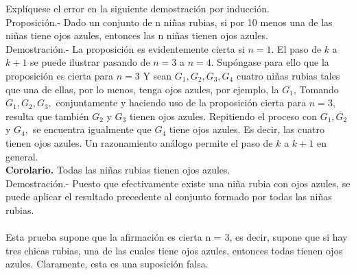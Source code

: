 \begin{teo}
Explíquese el error en la siguiente demostración por inducción.\\
Proposición.- Dado un conjunto de n niñas rubias, si por 10 menos una de las niñas tiene ojos azules, entonces las n niñas tienen ojos azules.\\
Demostración.-\; La proposición es evidentemente cierta si $n = 1$. El paso de $k$ a $k + 1$ se puede ilustrar pasando de $n = 3$ a $n = 4$. Supóngase para ello que la proposición es cierta para $n=3$ Y sean $G_1, G_2, G_3, G_4$ cuatro niñas rubias tales que una de ellas, por lo menos, tenga ojos azules, por ejemplo, la $G_1$, Tomando $G_1,G_2, G_3,$ conjuntamente y haciendo uso de la proposición cierta para $n =3$, resulta que también $G_2$ y $G_3$ tienen ojos azules. Repitiendo el proceso con $G_1, G_2$ y $G_4,$ se encuentra igualmente que $G_4$ tiene ojos azules. Es decir, las cuatro tienen ojos azules. Un razonamiento análogo permite el paso de $k$ a $k + 1$ en general.\\
\textbf{Corolario.} Todas las niñas rubias tienen ojos azules.\\
Demostración.- \; Puesto que efectivamente existe una niña rubia con ojos azules, se puede aplicar el resultado precedente al conjunto formado por todas las niñas rubias.\\\\
Esta prueba supone que la afirmación es cierta n = 3, es decir, supone que si hay tres chicas rubias, una de las cuales tiene ojos azules, entonces todas tienen ojos azules. Claramente, esta es una suposición falsa.\\\\
\end{teo}


